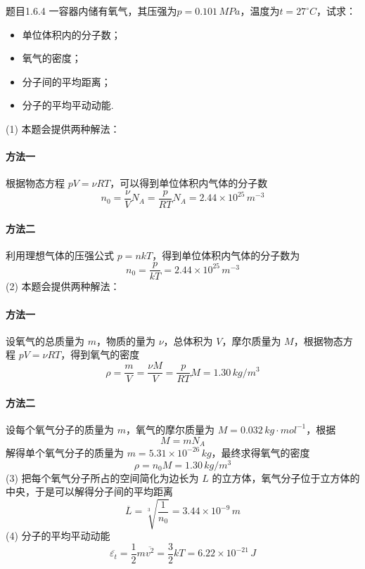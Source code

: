 \begin{question}{题目1.6.4}
    一容器内储有氧气，其压强为$p = 0.101\,\si{MPa}$，温度为$t = 27^\circ C$，试求：
    \begin{itemize}
        \item[(1)] 单位体积内的分子数；
        \item[(2)] 氧气的密度；
        \item[(3)] 分子间的平均距离；
        \item[(4)] 分子的平均平动动能.
    \end{itemize}
\end{question}
\begin{solution}
    (1) 本题会提供两种解法：
    \paragraph{方法一} \quad 根据物态方程 $pV = \nu RT$，可以得到单位体积内气体的分子数
    $$
        n_0 = \frac{\nu}{V}N_A = \frac{p}{RT}N_A = 2.44 \times 10^{25} \,\si{m^{-3}}
    $$
    \paragraph{方法二} 利用理想气体的压强公式 $p=nkT$，得到单位体积内气体的分子数为
    $$
        n_0 = \frac{p}{kT} = 2.44 \times 10^{25}\,\si{m^{-3}}
    $$
    (2) 本题会提供两种解法：
    \paragraph{方法一} \quad 设氧气的总质量为 $m$，物质的量为 $\nu$，总体积为 $V$，摩尔质量为 $M$，根据物态方程 $pV = \nu RT$，得到氧气的密度
    $$
        \rho = \frac{m}{V}
        = \frac{\nu M}{V}
        = \frac{p}{RT}M
        = 1.30 \,\si{kg/m^3}
    $$
    \paragraph{方法二} 设每个氧气分子的质量为 $m$，氧气的摩尔质量为 $M = 0.032 \,\si{kg \cdot mol^{-1}}$，根据
    $$
        M = mN_A
    $$
    解得单个氧气分子的质量为 $m = 5.31 \times 10^{-26} \,\si{kg}$，最终求得氧气的密度
    $$
        \rho = n_0 M = 1.30 \,\si{kg/m^3}
    $$
    (3) 把每个氧气分子所占的空间简化为边长为 $L$ 的立方体，氧气分子位于立方体的中央，于是可以解得分子间的平均距离
    $$
        \overline{L} = \sqrt[3]{\frac{1}{n_0}} = 3.44 \times 10^{-9} \,\si{m}
    $$
    (4) 分子的平均平动动能
    $$
        \overline{\varepsilon_t} = \frac{1}{2}m\overline{v^2} = \frac{3}{2}kT = 6.22\times10^{-21} \,\si{J}
    $$
\end{solution}

